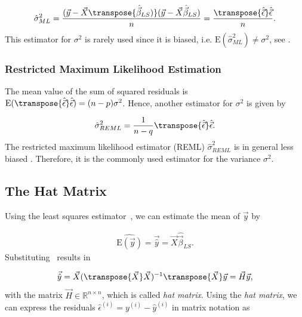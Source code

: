 \begin{align} \label{eq:sigma_ML}
	\hat \sigma^2_{ML} = 
		\frac{(\vec{y} - \vec{X} \transpose{\hat{\vec{\beta}}_{LS})}(\vec{y} - \vec{X} \hat{\vec{\beta}}_{LS})}{n} = \frac{\transpose{\hat{\vec{\epsilon}}} \hat{\vec{\epsilon}}}{n}.
\end{align}
%
This estimator for $\sigma^2$ is rarely used since it is biased, i.e. $\text{E}(\hat \sigma^2_{ML}) \ne \sigma^2$, see \cite{fahrmeir2007regression}. 

\subsubsection{Restricted Maximum Likelihood Estimation}

The mean value of the sum of squared residuals is $\text{E}(\transpose{\hat{\vec{\epsilon}}} \hat{\vec{\epsilon}}) = (n - p)\sigma^2$. Hence, another estimator for $\sigma^2$ is given by

\begin{align} \label{eq:sigma_REML}
	\hat \sigma^2_{REML} = \frac{1}{n-q} \transpose{\hat{\vec{\epsilon}}} \hat{\vec{\epsilon}}.
\end{align}
%
The restricted maximum likelihood estimator (REML) $\hat \sigma^2_{REML}$ is in general less biased \cite{fahrmeir2007regression}. Therefore, it is the commonly used estimator for the variance $\sigma^2$.

\subsection{The Hat Matrix}

Using the least squares estimator~, we can estimate the mean of $\vec{y}$ by 

\begin{align} \label{eq:mean_of_y}
	\widehat{\text{E}(\vec{y})} = \vec{\hat{y}} = \vec{X} \hat{\vec{\beta}}_{LS}.
\end{align}
%
Substituting~ results in 

\begin{align} \label{eq:hat-matrix}
	\vec{\hat{y}} = \vec{X}(\transpose{\vec{X}} \vec{X})^{-1} \transpose{\vec{X}} \vec{y} = \vec{H} \vec{y},
\end{align}
%
with the matrix $\vec{H} \in \mathbb{R}^{n \times n}$, which is called \emph{hat matrix}. Using the \emph{hat matrix}, we can express the residuals $\hat \epsilon^{(i)} = y^{(i)} - \hat y^{(i)}$ in matrix notation as

